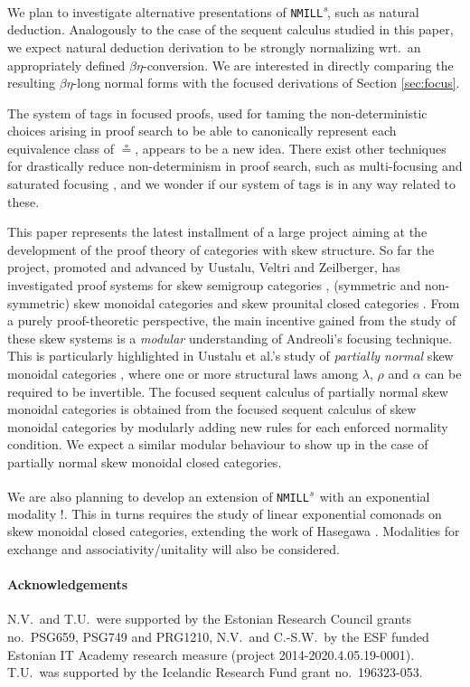 \documentclass[copyright,creativecommons]{eptcs}
\theoremstyle{definition}
\newcommand{\NMILL}{\texttt{NMILL}}
\newcommand{\SkNMILL}{\NMILL\textsuperscript{\textit{s}}}
\begin{document}
We plan to investigate alternative presentations of \SkNMILL, such as natural deduction. Analogously to the case of the sequent calculus studied in this paper, we expect natural deduction derivation to be strongly normalizing wrt.\ an appropriately defined $\beta\eta$-conversion. We are interested in directly comparing the resulting $\beta\eta$-long normal forms with the focused derivations of Section \ref{sec:focus}.

The system of tags in focused proofs, used for taming the non-deterministic choices arising in proof search to be able to canonically represent each equivalence class of $\circeq$, appears to be a new idea. %
There exist other techniques for drastically reduce non-determinism in proof search, such as multi-focusing \cite{chaudhuri:canonical:2008} and saturated focusing \cite{scherer:simple:2015}, and we wonder if our system of tags is in any way related to these. %

This paper represents the latest installment of a large project aiming at the development of the proof theory of categories with skew structure. So far the project, promoted and advanced by Uustalu, Veltri and Zeilberger, has investigated proof systems for skew semigroup categories \cite{zeilberger:semiassociative:19}, (symmetric and non-symmetric) skew monoidal categories \cite{uustalu:sequent:2021,uustalu:proof:nodate,veltri:coherence:2021} and skew prounital closed categories \cite{uustalu:deductive:nodate}. From a purely proof-theoretic perspective, the main incentive gained from the study of these skew systems is a \emph{modular} understanding of Andreoli's focusing technique. This is particularly highlighted in Uustalu et al.'s study of \emph{partially normal} skew monoidal categories \cite{uustalu:proof:nodate}, where one or more structural laws among $\lambda$, $\rho$ and $\alpha$ can be required to be invertible. The focused sequent calculus of partially normal skew monoidal categories is obtained from the focused sequent calculus of skew monoidal categories by modularly adding new rules for each enforced normality condition.
We expect a similar modular behaviour to show up in the case of partially normal skew monoidal closed categories.

We are also planning to develop an extension of \SkNMILL\ with an exponential modality $!$. This in turns requires the study of linear exponential comonads on skew monoidal closed categories, extending the work of Hasegawa \cite{hasegawa:linear:2017}. Modalities for exchange \cite{jiang:lambek:2019} and associativity/unitality will also be considered.

\paragraph{Acknowledgements} N.V.\ and T.U.\ were supported by the
Estonian Research Council grants no.~PSG659, PSG749 and PRG1210, N.V.\ and
C.-S.W.\ by the ESF funded Estonian IT Academy research measure
(project 2014-2020.4.05.19-0001). T.U.\ was supported by the Icelandic
Research Fund grant no.~196323-053.

  
  
\end{document}

